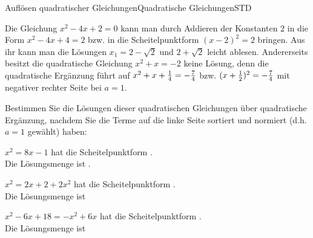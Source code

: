 \begin{MXContent}{Auflösen quadratischer Gleichungen}{Quadratische Gleichungen}{STD}
\begin{MExample}
Die Gleichung $x^2-4x+2=0$ kann man durch Addieren der Konstanten $2$ in die Form $x^2-4x+4=2$ bzw. in die Scheitelpunktform $(x-2)^2=2$ bringen. 
Aus ihr kann man die Lösungen $x_1=2-\sqrt{2}$ und $2+\sqrt{2}$ leicht ablesen. Andererseits besitzt die quadratische Gleichung %
$x^2+x=-2$ keine Lösung, denn die quadratische Ergänzung führt auf $x^2+x+\tfrac{1}{4}=-\tfrac{7}{4}$ bzw. $(x+\tfrac{1}{2})^2=-\tfrac{7}{4}$ mit negativer rechter Seite bei $a=1$.
\end{MExample}

\begin{MExercise}
Bestimmen Sie die Lösungen dieser quadratischen Gleichungen über quadratische Ergänzung, nachdem Sie die Terme auf die linke Seite sortiert und normiert (d.h. $a=1$ gewählt) haben:
\begin{MExerciseItems}
\item{$x^2=8x-1$ hat die Scheitelpunktform .\\Die Lösungsmenge ist .}
\item{$x^2=2x+2+2x^2$ hat die Scheitelpunktform .\\Die Lösungsmenge ist }
\item{$x^2-6x+18=-x^2+6x$ hat die Scheitelpunktform .\\Die Lösungsmenge ist }
\end{MExerciseItems}


\end{MExercise}
\end{MXContent}
